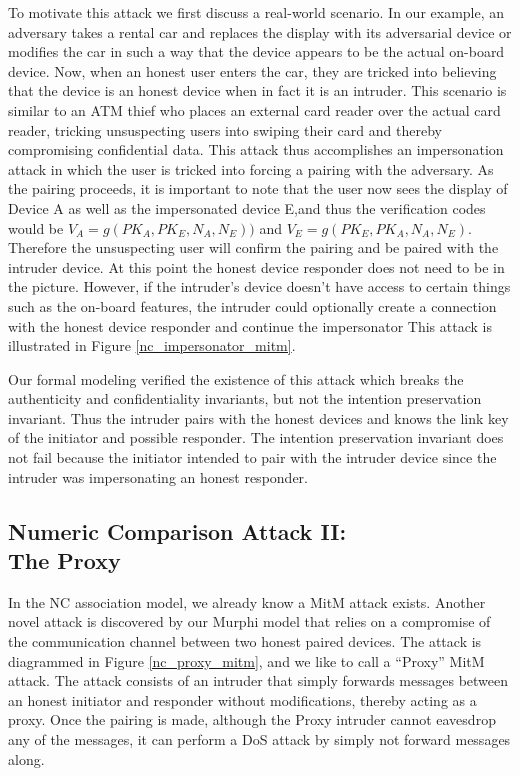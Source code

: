 \documentclass{acm_proc_article-sp}
\begin{document}
To motivate this attack we first discuss a real-world scenario. In our example, an adversary takes a rental car and replaces the display with its adversarial device or modifies the car in such a way that the device appears to be the actual on-board device. Now, when an honest user enters the car, they are tricked into believing that the device is an honest device when in fact it is an intruder. This scenario is similar to an ATM thief who places an external card reader over the actual card reader, tricking unsuspecting users into swiping their card and thereby compromising confidential data. This attack thus accomplishes an impersonation attack in which the user is tricked into forcing a pairing with the adversary.  As the pairing proceeds, it is important to note that the user now sees the display of Device A as well as the impersonated device E,and thus the verification codes would be $V_A = g(PK_A, PK_E, N_A, N_E))$ and $V_E = g(PK_E, PK_A, N_A, N_E)$. Therefore the  unsuspecting user will confirm the pairing and be paired with the intruder device. At this point the honest device responder does not need to be in the picture. However, if the intruder's device doesn't have access to certain things such as the on-board features,  the intruder could optionally create a connection with the honest device responder and  continue the impersonator This attack is illustrated in Figure \ref{nc_impersonator_mitm}.

Our formal modeling verified the existence of this attack which breaks the authenticity and confidentiality invariants, but not the intention preservation invariant. Thus the intruder pairs with the honest devices and knows the link key of the initiator and possible responder. The intention preservation invariant does not fail because the initiator intended to pair with the intruder device since the intruder was impersonating an honest responder.

\subsection{Numeric Comparison Attack II:\\The Proxy}
In the NC association model, we already know a MitM attack exists. Another novel attack is discovered by our Murphi model that relies on a compromise of the communication channel between two honest paired devices. The attack is diagrammed in Figure \ref{nc_proxy_mitm}, and we like to call a ``Proxy'' MitM attack. The attack consists of an intruder that simply forwards messages between an honest initiator and responder without modifications, thereby acting as a proxy. Once the pairing is made, although the Proxy intruder cannot eavesdrop any of the messages, it can perform a DoS attack by simply not forward messages along.
\end{document}
